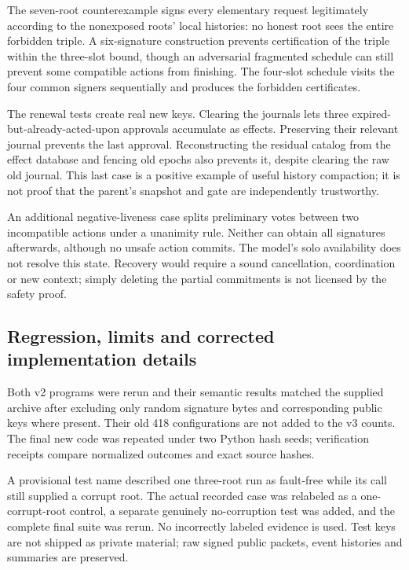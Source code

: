 \documentclass[11pt,a4paper]{article}
\theoremstyle{definition}\newtheorem{definition}{Definition}
\begin{document}
The seven-root counterexample signs every elementary request legitimately according to the nonexposed roots' local histories: no honest root sees the entire forbidden triple. A six-signature construction prevents certification of the triple within the three-slot bound, though an adversarial fragmented schedule can still prevent some compatible actions from finishing. The four-slot schedule visits the four common signers sequentially and produces the forbidden certificates.

The renewal tests create real new keys. Clearing the journals lets three expired-but-already-acted-upon approvals accumulate as effects. Preserving their relevant journal prevents the last approval. Reconstructing the residual catalog from the effect database and fencing old epochs also prevents it, despite clearing the raw old journal. This last case is a positive example of useful history compaction; it is not proof that the parent's snapshot and gate are independently trustworthy.

An additional negative-liveness case splits preliminary votes between two incompatible actions under a unanimity rule. Neither can obtain all signatures afterwards, although no unsafe action commits. The model's solo availability does not resolve this state. Recovery would require a sound cancellation, coordination or new context; simply deleting the partial commitments is not licensed by the safety proof.

\subsection{Regression, limits and corrected implementation details}
Both v2 programs were rerun and their semantic results matched the supplied archive after excluding only random signature bytes and corresponding public keys where present. Their old 418 configurations are not added to the v3 counts. The final new code was repeated under two Python hash seeds; verification receipts compare normalized outcomes and exact source hashes.

A provisional test name described one three-root run as fault-free while its call still supplied a corrupt root. The actual recorded case was relabeled as a one-corrupt-root control, a separate genuinely no-corruption test was added, and the complete final suite was rerun. No incorrectly labeled evidence is used. Test keys are not shipped as private material; raw signed public packets, event histories and summaries are preserved.
\end{document}
